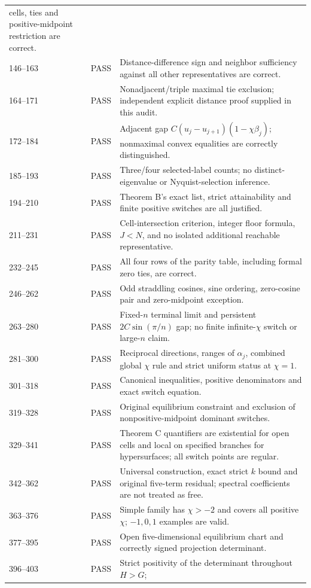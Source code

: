 \documentclass[11pt]{article}
\begin{document}
\begin{longtable}{@{}L{0.11\textwidth}L{0.18\textwidth}L{0.65\textwidth}@{}}
cells, ties and positive-midpoint restriction are correct.\\
146--163&PASS&Distance-difference sign and neighbor sufficiency against
all other representatives are correct.\\
164--171&PASS&Nonadjacent/triple maximal tie exclusion; independent explicit
distance proof supplied in this audit.\\
172--184&PASS&Adjacent gap $C(u_j-u_{j+1})(1-\chi\beta_j)$; nonmaximal
convex equalities are correctly distinguished.\\
185--193&PASS&Three/four selected-label counts; no distinct-eigenvalue or
Nyquist-selection inference.\\
194--210&PASS&Theorem B's exact list, strict attainability and finite
positive switches are all justified.\\
211--231&PASS&Cell-intersection criterion, integer floor formula,
$J<N$, and no isolated additional reachable representative.\\
232--245&PASS&All four rows of the parity table, including formal zero
ties, are correct.\\
246--262&PASS&Odd straddling cosines, sine ordering, zero-cosine pair and
zero-midpoint exception.\\
263--280&PASS&Fixed-$n$ terminal limit and persistent $2C\sin(\pi/n)$
gap; no finite infinite-$\chi$ switch or large-$n$ claim.\\
281--300&PASS&Reciprocal directions, ranges of $\alpha_j$, combined
global $\chi$ rule and strict uniform status at $\chi=1$.\\
301--318&PASS&Canonical inequalities, positive denominators and exact
switch equation.\\
319--328&PASS&Original equilibrium constraint and exclusion of
nonpositive-midpoint dominant switches.\\
329--341&PASS&Theorem C quantifiers are existential for open cells and
local on specified branches for hypersurfaces; all switch points are regular.\\
342--362&PASS&Universal construction, exact strict $k$ bound and original
five-term residual; spectral coefficients are not treated as free.\\
363--376&PASS&Simple family has $\chi>-2$ and covers all positive
$\chi$; $-1,0,1$ examples are valid.\\
377--395&PASS&Open five-dimensional equilibrium chart and correctly signed
projection determinant.\\
396--403&PASS&Strict positivity of the determinant throughout $H>G$;

\end{longtable}
\end{document}

